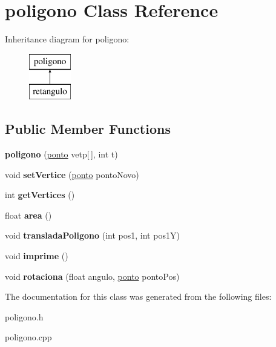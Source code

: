 \hypertarget{classpoligono}{}\section{poligono Class Reference}
\label{classpoligono}
Inheritance diagram for poligono\+:\begin{figure}[H]
\begin{center}
\leavevmode
\includegraphics[height=2.000000cm]{classpoligono}
\end{center}
\end{figure}
\subsection*{Public Member Functions}
\begin{DoxyCompactItemize}
\item 
\mbox{\label{classpoligono_a21b52ae5f6df8800e6249cb0936d63cf}} 
{\bfseries poligono} (\hyperlink{classponto}{ponto} vetp\mbox{[}$\,$\mbox{]}, int t)
\item 
\mbox{\label{classpoligono_a5358c8e540b968f4d2b229d7e7893896}} 
void {\bfseries set\+Vertice} (\hyperlink{classponto}{ponto} ponto\+Novo)
\item 
\mbox{\label{classpoligono_a6966febfd0e3eaebfb31a94b86cbf78b}} 
int {\bfseries get\+Vertices} ()
\item 
\mbox{\label{classpoligono_a6f71f348af871870f02fcc15e506c240}} 
float {\bfseries area} ()
\item 
\mbox{\label{classpoligono_af4220ccf36d04de8b23ad3b956804a19}} 
void {\bfseries translada\+Poligono} (int pos1, int pos1Y)
\item 
\mbox{\label{classpoligono_a8b4a4a55f8488305a04f8c967b0dc8bf}} 
void {\bfseries imprime} ()
\item 
\mbox{\label{classpoligono_acdf2c4530d4964e3c004b42dd0e6996e}} 
void {\bfseries rotaciona} (float angulo, \hyperlink{classponto}{ponto} ponto\+Pos)
\end{DoxyCompactItemize}


The documentation for this class was generated from the following files\+:\begin{DoxyCompactItemize}
\item 
poligono.\+h\item 
poligono.\+cpp\end{DoxyCompactItemize}
